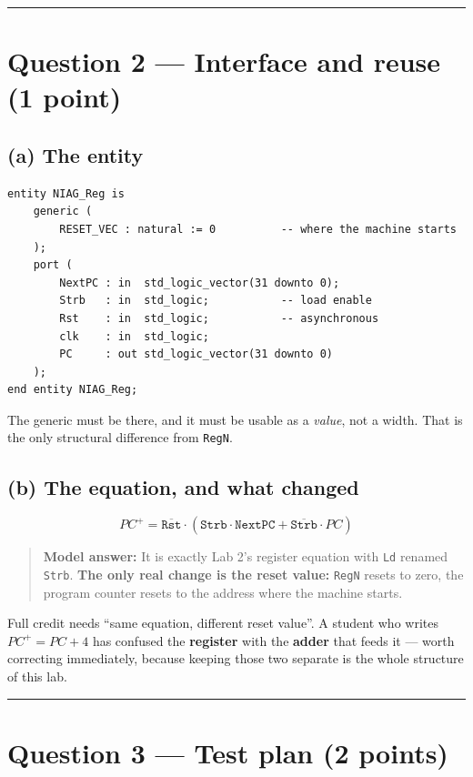 \documentclass[11pt]{article}
\newcommand{\code}[1]{\texttt{#1}}
\newcommand{\hr}{\vspace{2pt}\hrule\vspace{6pt}}
\begin{document}
\vspace{4pt}\hr

\section*{Question 2 --- Interface and reuse (1 point)}

\subsection*{(a) The entity}

\begin{lstlisting}
entity NIAG_Reg is
    generic (
        RESET_VEC : natural := 0          -- where the machine starts
    );
    port (
        NextPC : in  std_logic_vector(31 downto 0);
        Strb   : in  std_logic;           -- load enable
        Rst    : in  std_logic;           -- asynchronous
        clk    : in  std_logic;
        PC     : out std_logic_vector(31 downto 0)
    );
end entity NIAG_Reg;
\end{lstlisting}

The generic must be there, and it must be usable as a \emph{value}, not a width.
That is the only structural difference from \code{RegN}.

\subsection*{(b) The equation, and what changed}

\[
PC^{+} = \overline{\code{Rst}} \cdot \left( \code{Strb} \cdot \code{NextPC}
   + \overline{\code{Strb}} \cdot PC \right)
\]

\begin{quote}
\textbf{Model answer:} It is exactly Lab 2's register equation with
\code{Ld} renamed \code{Strb}. \textbf{The only real change is the reset value:}
\code{RegN} resets to zero, the program counter resets to the address where the
machine starts.
\end{quote}

Full credit needs ``same equation, different reset value''. A student who writes
$PC^{+} = PC + 4$ has confused the \textbf{register} with the \textbf{adder} that
feeds it --- worth correcting immediately, because keeping those two separate is
the whole structure of this lab.

\vspace{4pt}\hr

\section*{Question 3 --- Test plan (2 points)}
\end{document}
